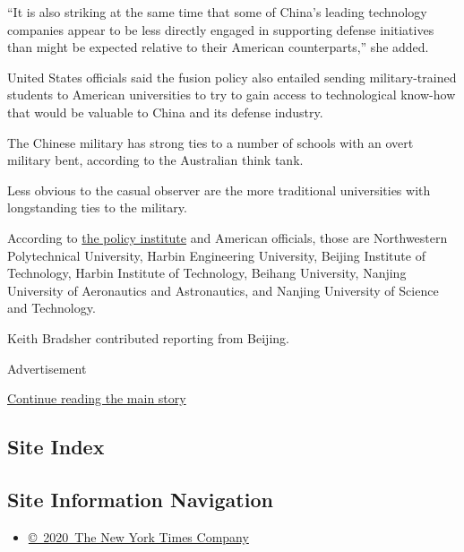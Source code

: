``It is also striking at the same time that some of China's leading
technology companies appear to be less directly engaged in supporting
defense initiatives than might be expected relative to their American
counterparts,'' she added.

United States officials said the fusion policy also entailed sending
military-trained students to American universities to try to gain access
to technological know-how that would be valuable to China and its
defense industry.

The Chinese military has strong ties to a number of schools with an
overt military bent, according to the Australian think tank.

Less obvious to the casual observer are the more traditional
universities with longstanding ties to the military.

According to
\href{https://www.aspi.org.au/report/china-defence-universities-tracker}{the
policy institute} and American officials, those are Northwestern
Polytechnical University, Harbin Engineering University, Beijing
Institute of Technology, Harbin Institute of Technology, Beihang
University, Nanjing University of Aeronautics and Astronautics, and
Nanjing University of Science and Technology.

Keith Bradsher contributed reporting from Beijing.

Advertisement

\protect\hyperlink{after-bottom}{Continue reading the main story}

\hypertarget{site-index}{%
\subsection{Site Index}\label{site-index}}

\hypertarget{site-information-navigation}{%
\subsection{Site Information
Navigation}\label{site-information-navigation}}

\begin{itemize}
\tightlist
\item
  \href{https://help.nytimes3xbfgragh.onion/hc/en-us/articles/115014792127-Copyright-notice}{©~2020~The
  New York Times Company}
\end{itemize}

